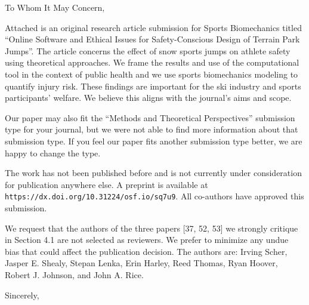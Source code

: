 \documentclass[en]{tuletter}
\date{October 27, 2021}
\begin{document}
\makeheader
\opening{To Whom It May Concern,}

Attached is an original research article submission for Sports Biomechanics
titled ``Online Software and Ethical Issues for Safety-Conscious Design of
Terrain Park Jumps''. The article concerns the effect of snow sports jumps on
athlete safety using theoretical approaches. We frame the results and use of
the computational tool in the context of public health and we use sports
biomechanics modeling to quantify injury risk. These findings are important for
the ski industry and sports participants' welfare. We believe this aligns with
the journal's aims and scope.

Our paper may also fit the ``Methods and Theoretical Perspectives'' submission
type for your journal, but we were not able to find more information about that
submission type. If you feel our paper fits another submission type better, we
are happy to change the type.

The work has not been published before and is not currently under consideration
for publication anywhere else. A preprint is available at
\verb|https://dx.doi.org/10.31224/osf.io/sq7u9|. All co-authors have approved
this submission.

We request that the authors of the three papers [37, 52, 53] we strongly
critique in Section 4.1 are not selected as reviewers. We prefer to minimize
any undue bias that could affect the publication decision. The authors are:
Irving Scher, Jasper E. Shealy, Stepan Lenka, Erin Harley, Reed Thomas, Ryan
Hoover, Robert J. Johnson, and John A. Rice.

\closing{Sincerely,}
\end{document}

